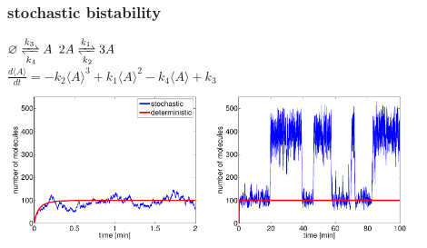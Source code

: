 \begin{frame}
\frametitle{stochastic bistability}
\begin{center}
{\scriptsize
$\varnothing \xrightleftharpoons[k_4]{k_3} A$ \hskip 1cm $2A \xrightleftharpoons[k_2]{k_1} 3A$\\
$\frac{d \langle A \rangle}{dt} = -k_2 \langle A \rangle^3 + k_1 \langle A \rangle^2 - k_4 \langle A \rangle + k_3$}
\includegraphics[width=0.9\textwidth]{fig/stochsimbistable.pdf}
\end{center}
\end{frame}

